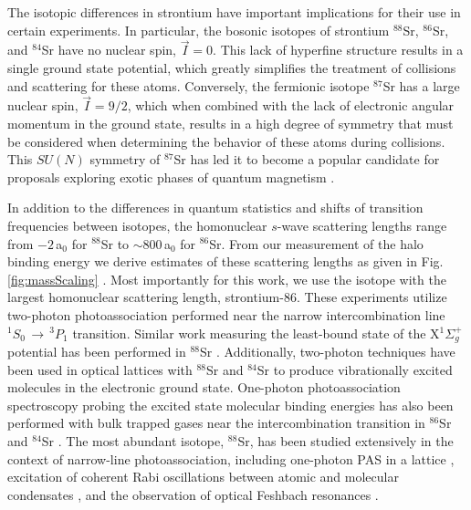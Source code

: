The isotopic differences in strontium have important implications for their use in certain experiments.
In particular, the bosonic isotopes of strontium $^{88}$Sr, $^{86}$Sr, and $^{84}$Sr have no nuclear spin, $\vec{I}=0$.
This lack of hyperfine structure results in a single ground state potential, which greatly simplifies the treatment of collisions and scattering for these atoms.
Conversely, the fermionic isotope $^{87}$Sr has a large nuclear spin, $\vec{I}=9/2$, which when combined with the lack of electronic angular momentum in the ground state, results in a high degree of symmetry that must be considered when determining the behavior of these atoms during collisions.
This $SU(N)$ symmetry of $^{87}$Sr has led it to become a popular candidate for proposals exploring exotic phases of quantum magnetism \cite{Beverland2016,cre14,Chen2015}.

In addition to the differences in quantum statistics and shifts of transition frequencies between isotopes, the homonuclear $s$-wave scattering lengths range from $-2\,$a$_0$ for $^{88}$Sr to $\sim\!800\,$a$_0$ for $^{86}$Sr.
From our measurement of the halo binding energy we derive estimates of these scattering lengths as given in Fig.\,\ref{fig:massScaling} \cite{Aman2018}.
Most importantly for this work, we use the isotope with the largest homonuclear scattering length, strontium-86.
These experiments utilize two-photon photoassociation performed near the narrow intercombination line $^1S_0\,\rightarrow\,^3P_1$ transition.
Similar work measuring the least-bound state of the X$^1\Sigma_g^+$ potential has been performed in $^{88}$Sr \cite{MartinezDeEscobar2008}.
Additionally, two-photon techniques have been used in optical lattices with $^{88}$Sr \cite{Reinaudi2012, McGuyer2014, McGuyer2015a, rom12} and $^{84}$Sr \cite{Stellmer2012} to produce vibrationally excited molecules in the electronic ground state.
One-photon photoassociation spectroscopy probing the excited state molecular binding energies has also been performed with bulk trapped gases near the intercombination transition in $^{86}$Sr \cite{Borkowski2014a, Reschovsky} and $^{84}$Sr \cite{Stellmer2012, Reschovsky}.
The most abundant isotope, $^{88}$Sr, has been studied extensively in the context of narrow-line photoassociation, including one-photon PAS in a lattice \cite{Zelevinsky2006,McGuyer2013}, excitation of coherent Rabi oscillations between atomic and molecular condensates \cite{Yan2013b}, and the observation of optical Feshbach resonances \cite{Yan2013c, Blatt}.

